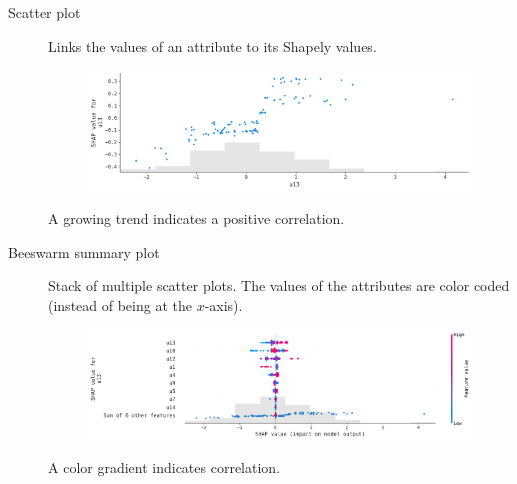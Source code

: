 \begin{description}
\begin{description}
\begin{description}
                        \item[Scatter plot] 
                            Links the values of an attribute to its Shapely values.
                            \begin{figure}[H]
                                \raggedleft
                                \includegraphics[width=0.8\linewidth]{./img/_biomed_shap_scatter.pdf}
                            \end{figure}

                            \begin{remark}
                                A growing trend indicates a positive correlation.
                            \end{remark}

                        \item[Beeswarm summary plot] 
                            Stack of multiple scatter plots. The values of the attributes are color coded (instead of being at the $x$-axis).
                            \begin{figure}[H]
                                \raggedleft
                                \includegraphics[width=0.8\linewidth]{./img/_biomed_shap_beeswarm.pdf}
                            \end{figure}

                            \begin{remark}
                                A color gradient indicates correlation.
                            \end{remark}


\end{description}
\end{description}
\end{description}

